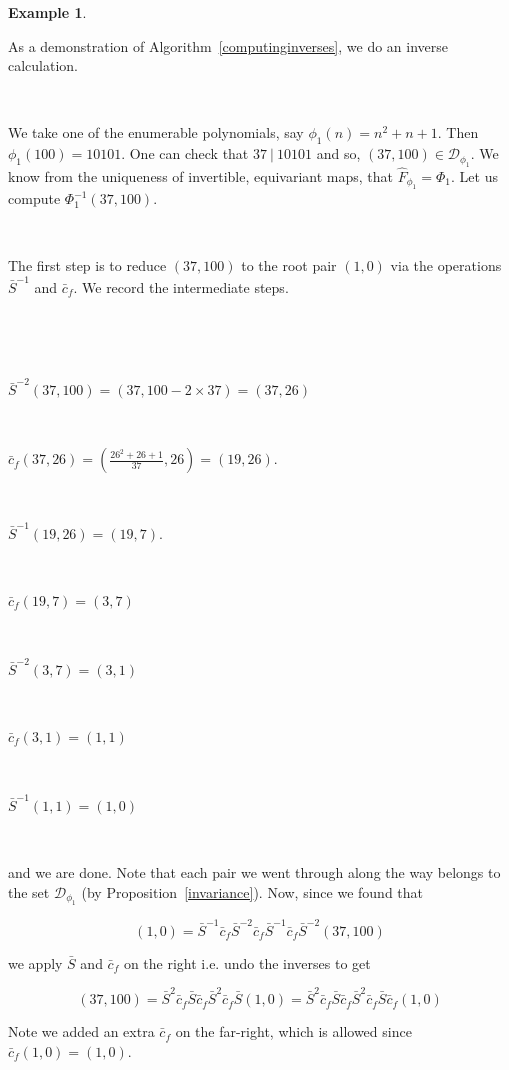 \documentclass{article}
\newtheorem{example}[theorem]{Example}  %
\begin{document}
\begin{example}
\end{example}

As a demonstration of Algorithm~\ref{computinginverses}, we do an inverse calculation.

\

We take one of the enumerable polynomials, say  $\phi_1(n) = n^2 + n + 1$. Then $\phi_1(100) = 10101$. One can check that $37 \ \lvert \ 10101$ and so, $(37, 100) \in \mathcal{D}_{\phi_1}$. We know from the uniqueness of invertible, equivariant maps, that $\hat{F}_{\phi_1} = \Phi_1$. Let us compute $\Phi_1^{-1}(37,100)$. 

\


The first step is to reduce $(37, 100)$ to the root pair $(1,0)$ via the operations $\bar{S}^{-1}$ and $\bar{c}_f$. We record the intermediate steps.

\

\

$\bar{S}^{-2}(37, 100) = (37, 100 - 2 \times 37) = (37, 26)$

\

$\bar{c}_f(37,26) = (\frac{26^2 + 26 + 1}{37}, 26) = (19, 26)$.

\

$\bar{S}^{-1}(19, 26) = (19, 7)$.

\

$\bar{c}_f(19,7) = (3,7)$

\

$\bar{S}^{-2}(3,7) = (3,1)$

\

$\bar{c}_f(3,1) = (1,1)$

\

$\bar{S}^{-1}(1,1)  = (1,0)$

\

and we are done. Note that each pair we went through along the way belongs to the set $\mathcal{D}_{\phi_1}$ (by Proposition~\ref{invariance}). Now, since we found that

$$(1,0) = \bar{S}^{-1}\bar{c}_f\bar{S}^{-2}\bar{c}_f\bar{S}^{-1}\bar{c}_f\bar{S}^{-2}(37,100)$$

we apply $\bar{S}$ and $\bar{c}_f$ on the right i.e. undo the inverses to get

$$(37,100) = \bar{S}^2\bar{c}_f\bar{S}\bar{c}_f\bar{S}^2\bar{c}_f\bar{S}(1,0)=\bar{S}^2\bar{c}_f\bar{S}\bar{c}_f\bar{S}^2\bar{c}_f\bar{S}\bar{c}_f(1,0)$$

Note we added an extra $\bar{c}_f$ on the far-right, which is allowed since $\bar{c}_f(1,0) = (1,0)$.
\end{document}
